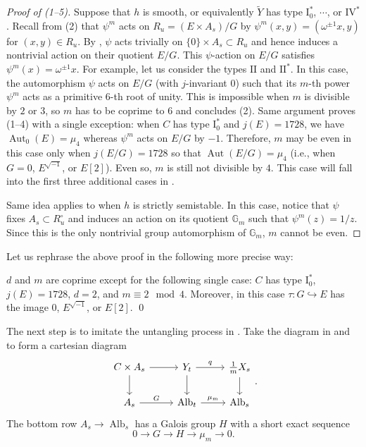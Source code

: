 \documentclass[reqno, letterpaper]{amsart}
\numberwithin{equation}{subsection}
\let\to\longrightarrow
\newcommand{\GG}{\mathbb{G}}
\DeclareMathOperator{\Aut}{Aut}
\DeclareMathOperator{\Alb}{Alb}
\begin{document}
		\begin{proof} [Proof of (1--5)]
			Suppose that $h$ is smooth, or equivalently $\tilde Y$ has type $\mathrm I_0^*$, $\cdots$, or $\mathrm{IV}^*$. Recall from (2) that $\psi^m$ acts on $R_u = (E \times A_s)/G$ by $\psi^m (x,y) = (\omega^{\pm1} x, y)$ for $(x,y) \in R_u$. By , $\psi$ acts trivially on $\{ 0 \} \times A_s \subset R_u$ and hence induces a nontrivial action on their quotient $E/G$. This $\psi$-action on $E/G$ satisfies $\psi^m(x) = \omega^{\pm1} x$. For example, let us consider the types $\mathrm{II}$ and $\mathrm{II}^*$. In this case, the automorphism $\psi$ acts on $E/G$ (with $j$-invariant $0$) such that its $m$-th power $\psi^m$ acts as a primitive $6$-th root of unity. This is impossible when $m$ is divisible by $2$ or $3$, so $m$ has to be coprime to $6$ and concludes (2). Same argument proves (1--4) with a single exception: when $C$ has type $\mathrm I_0^*$ and $j(E) = 1728$, we have $\Aut_0(E) = \mu_4$ whereas $\psi^m$ acts on $E/G$ by $-1$. Therefore, $m$ may be even in this case only when $j(E/G) = 1728$ so that $\Aut(E/G) = \mu_4$ (i.e., when $G = 0$, $E^{\sqrt{-1}}$, or $E[2]$). Even so, $m$ is still not divisible by $4$. This case will fall into the first three additional cases in .
			
			Same idea applies to when $h$ is strictly semistable. In this case, notice that $\psi$ fixes $A_s \subset R_u^\circ$ and induces an action on its quotient $\GG_m$ such that $\psi^m(z) = 1/z$. Since this is the only nontrivial group automorphism of $\GG_m$, $m$ cannot be even.
		\end{proof}
		
		Let us rephrase the above proof in the following more precise way:
		
		\begin{corollary} \label{cor:multiple fiber v:d and m are coprime}
			$d$ and $m$ are coprime except for the following single case: $C$ has type $\mathrm I_0^*$, $j(E) = 1728$, $d = 2$, and $m \equiv 2 \mod 4$. Moreover, in this case $\tau : G \hookrightarrow E$ has the image $0$, $E^{\sqrt{-1}}$, or $E[2]$. \qed
		\end{corollary}
		
		The next step is to imitate the untangling process in . Take the diagram in  and  to form a cartesian diagram
		\[\begin{tikzcd}
			C \times A_s \arrow[r] \arrow[d] & Y_t \arrow[r, "q"] \arrow[d] & \frac{1}{m} X_s \arrow[d] \\
			A_s \arrow[r, "G"] & \Alb_t \arrow[r, "\mu_m"] & \Alb_s
		\end{tikzcd}.\]
		The bottom row $A_s \to \Alb_s$ has a Galois group $H$ with a short exact sequence
		\begin{equation} \label{eq:multiple fiber v:ses of H}
			0 \to G \to H \to \mu_m \to 0 .
		\end{equation}
		
\end{document}
